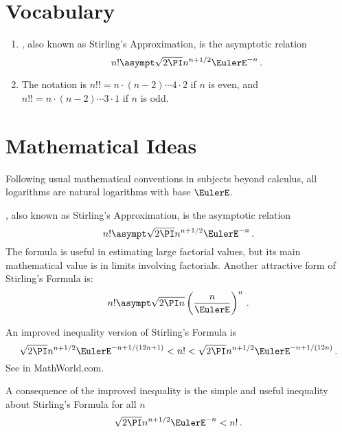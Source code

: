 \documentclass[12pt]{article}
\begin{document}
\hr

\section*{Vocabulary}
\begin{enumerate}
    \item
        , also known as Stirling's Approximation,
        is the asymptotic relation
        \[
            n!  \asympt \sqrt{2 \PI} n^{n+1/2} \EulerE^{-n}\,.
        \]
    \item
        The  notation is \( n!!  = n \cdot (n-2)
        \cdots 4 \cdot 2 \) if \( n \) is even, and \( n!!  = n \cdot (n-2)
        \cdots 3 \cdot 1 \) if \( n \) is odd.
\end{enumerate}

\hr

\section*{Mathematical Ideas}

Following usual mathematical conventions in subjects beyond calculus,
all logarithms are natural logarithms with base \( \EulerE \).

, also known as Stirling's Approximation, is the
asymptotic relation%
\[
    n!  \asympt \sqrt{2 \PI} n^{n+1/2} \EulerE^{-n}\,.
\] The formula is useful in estimating large factorial values, but its
main mathematical value is in limits involving factorials.  Another
attractive form of Stirling's Formula is:
\[
    n!  \asympt \sqrt{2 \PI n } \left( \frac{n}{\EulerE} \right)^n\,.
\]

An improved inequality version of Stirling's Formula is
\begin{equation}
    \sqrt{2 \PI} n^{n+1/2} \EulerE^{-n + 1/(12n+1)} < n!  < \sqrt{2 \PI}
    n^{n+1/2} \EulerE^{-n + 1/(12n)}\,.%
    \label{eq:sequences:stirlingsinequality}
\end{equation}
See  in MathWorld.com.

A consequence of the improved inequality is the simple and useful
inequality about Stirling's Formula for all \( n \)
\[
    \sqrt{2 \PI} n^{n+1/2} \EulerE^{-n} < n!\,.
\]%
\end{document}
